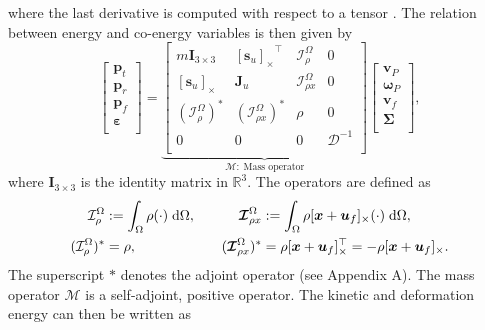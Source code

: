 \documentclass{svjour3}                     %
\newcommand{\crmat}[1]{\ensuremath{[#1]_{\times}}}
\begin{document}
where the last derivative is computed with respect to a tensor \cite{BRUGNOLI2019940}.
The relation between energy and co-energy variables is then given by
\begin{equation}
\label{eq:mass_op}
\begin{bmatrix}
\bm{p}_t \\ \bm{p}_r \\ \bm{p}_f \\ \bm\varepsilon \\
\end{bmatrix} = 
\underbrace{\begin{bmatrix}
	m \bm{I}_{3\times 3} & \crmat{\bm{s}_u}^\top & \mathcal{I}_\rho^{\Omega} & 0 \\
	\crmat{\bm{s}_u} & \bm{J}_u & \bm{\mathcal{I}}_{\rho x}^{\Omega} & 0  \\
	(\mathcal{I}_\rho^{\Omega})^* & (\bm{\mathcal{I}}_{\rho x}^{\Omega})^* & \rho & 0  \\
	0 & 0 & 0 & \bm{\mathcal{D}}^{-1} \\
	\end{bmatrix}}_{\bm{\mathcal{M}}: \; \text{Mass operator}}
\begin{bmatrix}
\bm{v}_P \\ \bm{\omega}_P  \\ \bm{v}_f  \\ \bm\Sigma \\
\end{bmatrix},
\end{equation}
where $\bm{I}_{3\times 3}$ is the identity matrix in $\mathbb{R}^3$. The operators are defined as
\begin{equation*}
\begin{aligned}
\mathcal{I}_\rho^\Omega &:=\int_{\Omega} \rho (\cdot) \d{\Omega}, \\
(\mathcal{I}_\rho^{\Omega})^* &= \rho, \\
\end{aligned} \qquad
\begin{aligned} 
\bm{\mathcal{I}}_{\rho x}^{\Omega} &:= \int_\Omega \rho \crmat{\bm{x}+\bm{u}_f} (\cdot) \d{\Omega}, \\
(\bm{\mathcal{I}}_{\rho x}^{\Omega})^* &= \rho \crmat{\bm{x}+\bm{u}_f}^\top= -\rho \crmat{\bm{x}+\bm{u}_f}. \\
\end{aligned}
\end{equation*}
The superscript $*$ denotes the adjoint operator (see Appendix A). The mass operator $\bm{\mathcal{M}}$ is a self-adjoint, positive operator. The kinetic and deformation energy can then be written as
\end{document}
